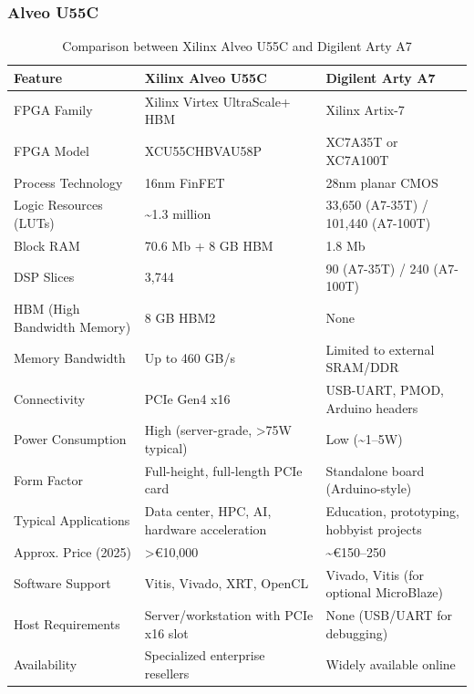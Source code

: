 \documentclass{beamer}
\begin{document}
\begin{frame}\frametitle{Alveo U55C}
\begin{table}[ht]
\centering
\fontsize{6}{7.2}\selectfont
\begin{tabular}{|l|p{3.5cm}|p{3.5cm}|}
\hline
\textbf{Feature} & \textbf{Xilinx Alveo U55C} & \textbf{Digilent Arty A7} \\
\hline
FPGA Family & Xilinx Virtex UltraScale+ HBM & Xilinx Artix-7 \\
\hline
FPGA Model & XCU55CHBVAU58P & XC7A35T or XC7A100T \\
\hline
Process Technology & 16nm FinFET & 28nm planar CMOS \\
\hline
Logic Resources (LUTs) & \textasciitilde1.3 million & 33,650 (A7-35T) / 101,440 (A7-100T) \\
\hline
Block RAM & 70.6 Mb + 8 GB HBM & 1.8 Mb \\
\hline
DSP Slices & 3,744 & 90 (A7-35T) / 240 (A7-100T) \\
\hline
HBM (High Bandwidth Memory) & 8 GB HBM2 & None \\
\hline
Memory Bandwidth & Up to 460 GB/s & Limited to external SRAM/DDR \\
\hline
Connectivity & PCIe Gen4 x16 & USB-UART, PMOD, Arduino headers \\
\hline
Power Consumption & High (server-grade, \textgreater 75W typical) & Low (\textasciitilde1--5W) \\
\hline
Form Factor & Full-height, full-length PCIe card & Standalone board (Arduino-style) \\
\hline
Typical Applications & Data center, HPC, AI, hardware acceleration & Education, prototyping, hobbyist projects \\
\hline
Approx. Price (2025) & \textgreater €10,000 & \textasciitilde €150--250 \\
\hline
Software Support & Vitis, Vivado, XRT, OpenCL & Vivado, Vitis (for optional MicroBlaze) \\
\hline
Host Requirements & Server/workstation with PCIe x16 slot & None (USB/UART for debugging) \\
\hline
Availability & Specialized enterprise resellers & Widely available online \\
\hline
\end{tabular}
\caption{Comparison between Xilinx Alveo U55C and Digilent Arty A7}
\label{tab:fpga_comparison}
\end{table}
\end{frame}
\end{document}
